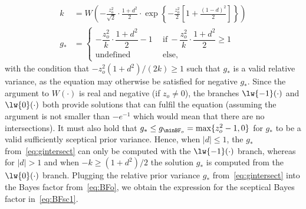 \begin{subappendices}
\begin{align}
  \label{eq:gintersect}
  k &= W\left(-\frac{z_{o}^{2}}{\sqrt{2}} \cdot \frac{1 + d^{2}}{2} \cdot
      \exp\left\{-\frac{z_o^2}{2} \left[1 + \frac{(1 - d)^2}{2}\right]\right\}\right)
  \nonumber \\
  g_* &=
  \begin{cases}
    -\dfrac{z_o^2}{k}\cdot \dfrac{1 + d^{2}}{2} - 1 & ~~ \text{if} ~
    -\dfrac{z_o^2}{k}\cdot\dfrac{1 + d^{2}}{2} \geq 1 \\
    \text{undefined} & ~~ \text{else},
  \end{cases}
\end{align}
with the condition that $-z_o^2(1 + d^{2})/(2k) \geq 1$ such that $g_*$ is a
valid relative variance, as the equation may otherwise be satisfied for negative
$g_*$. Since the argument to $W(\cdot)$ is real and negative (if $z_{o}\neq 0$),
the branches $\lw{-1}(\cdot)$ and $\lw{0}(\cdot)$ both provide solutions that
can fulfil the equation (assuming the argument is not smaller than $-e^{-1}$
which would mean that there are no intersections). It must also hold that
$g_{*} \leq g_{\minBF_{o}} = \max\{z_{o}^{2} - 1, 0\}$ for $g_{*}$ to be a valid
sufficiently sceptical prior variance. Hence, when $|d| \leq 1$, the $g_{*}$
from~\eqref{eq:gintersect} can only be computed with the $\lw{-1}(\cdot)$
branch, whereas for $|d| > 1$ and when $-k \geq (1 + d^{2})/2$ the solution
$g_{*}$ is computed from the $\lw{0}(\cdot)$ branch. Plugging the relative prior
variance $g_{*}$ from~\eqref{eq:gintersect} into the Bayes factor
from~\eqref{eq:BFo}, we obtain the expression for the sceptical Bayes factor
in~\eqref{eq:BFsc1}.



\end{subappendices}

